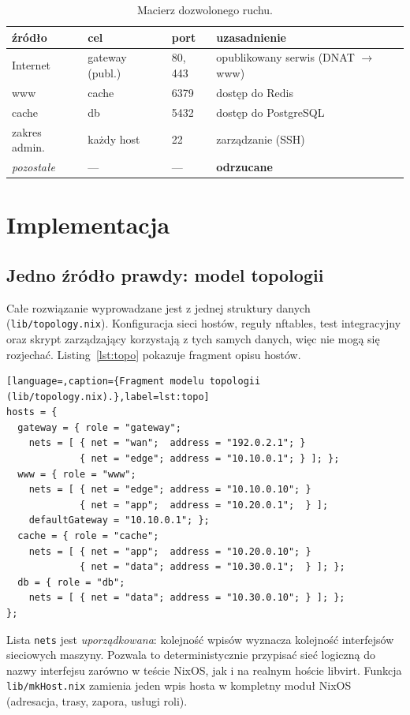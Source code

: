 \documentclass[11pt,a4paper]{article}
\begin{document}
\begin{table}[h]
\centering
\begin{tabular}{@{}llll@{}}
\toprule
źródło & cel & port & uzasadnienie \\
\midrule
Internet      & gateway (publ.) & 80, 443 & opublikowany serwis (DNAT $\to$ www) \\
www           & cache           & 6379    & dostęp do Redis \\
cache         & db              & 5432    & dostęp do PostgreSQL \\
zakres admin. & każdy host      & 22      & zarządzanie (SSH) \\
\textit{pozostałe} & --- & --- & \textbf{odrzucane} \\
\bottomrule
\end{tabular}
\caption{Macierz dozwolonego ruchu.}
\label{tab:matrix}
\end{table}

\section{Implementacja}

\subsection{Jedno źródło prawdy: model topologii}
Całe rozwiązanie wyprowadzane jest z jednej struktury danych
(\texttt{lib/topology.nix}). Konfiguracja sieci hostów, reguły nftables, test
integracyjny oraz skrypt zarządzający korzystają z tych samych danych, więc nie
mogą się rozjechać. Listing~\ref{lst:topo} pokazuje fragment opisu hostów.

\begin{lstlisting}[language=,caption={Fragment modelu topologii (lib/topology.nix).},label=lst:topo]
hosts = {
  gateway = { role = "gateway";
    nets = [ { net = "wan";  address = "192.0.2.1"; }
             { net = "edge"; address = "10.10.0.1"; } ]; };
  www = { role = "www";
    nets = [ { net = "edge"; address = "10.10.0.10"; }
             { net = "app";  address = "10.20.0.1";  } ];
    defaultGateway = "10.10.0.1"; };
  cache = { role = "cache";
    nets = [ { net = "app";  address = "10.20.0.10"; }
             { net = "data"; address = "10.30.0.1";  } ]; };
  db = { role = "db";
    nets = [ { net = "data"; address = "10.30.0.10"; } ]; };
};
\end{lstlisting}

Lista \texttt{nets} jest \emph{uporządkowana}: kolejność wpisów wyznacza
kolejność interfejsów sieciowych maszyny. Pozwala to deterministycznie
przypisać sieć logiczną do nazwy interfejsu zarówno w teście NixOS, jak i na
realnym hoście libvirt. Funkcja \texttt{lib/mkHost.nix} zamienia jeden wpis
hosta w kompletny moduł NixOS (adresacja, trasy, zapora, usługi roli).
\end{document}
